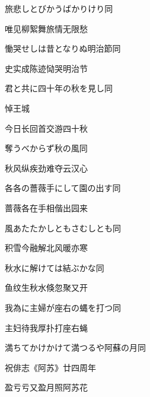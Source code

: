 \begin{haiku}
    {\FH 旅悲しとびかうばかりけり}\hfill{\FH 同}

    {\FK 唯见柳絮舞旅情无限愁}
\end{haiku}

\begin{haiku}
    {\FH 慟哭せしは昔となりぬ明治節}\hfill{\FH 同}

    {\FK 史实成陈迹恸哭明治节}
\end{haiku}

\begin{haiku}
    {\FH 君と共に四十年の秋を見し}\hfill{\FH 同}

    {\FK 悼王城}

    {\FK 今日长回首交游四十秋}
\end{haiku}

\begin{haiku}
    {\FH {}奪うべからず秋の風}\hfill{\FH 同}

    {\FK 秋风纵疾劲难夺云汉心}
\end{haiku}

\begin{haiku}
    {\FH 各各の薔薇手にして園の出す}\hfill{\FH 同}

    {\FK 蔷薇各在手相偕出园来}
\end{haiku}

\begin{haiku}
    {\FH {}風あたたかしともさむしとも}\hfill{\FH 同}

    {\FK 积雪今融解北风暖亦寒}
\end{haiku}

\begin{haiku}
    {\FH 秋水に解けては結ぶかな}\hfill{\FH 同}

    {\FK 鱼纹生秋水倏忽聚又开}
\end{haiku}

\begin{haiku}
    {\FH 我為に主婦が座右の蝿を打つ}\hfill{\FH 同}

    {\FK 主妇待我厚扑打座右蝇}
\end{haiku}

\begin{haiku}
    {\FH 満ちてかけかけて満つるや阿蘇の月}\hfill{\FH 同}

    {\FK 祝俳志《阿苏》廿四周年}

    {\FK 盈亏亏又盈月照阿苏花}
\end{haiku}

